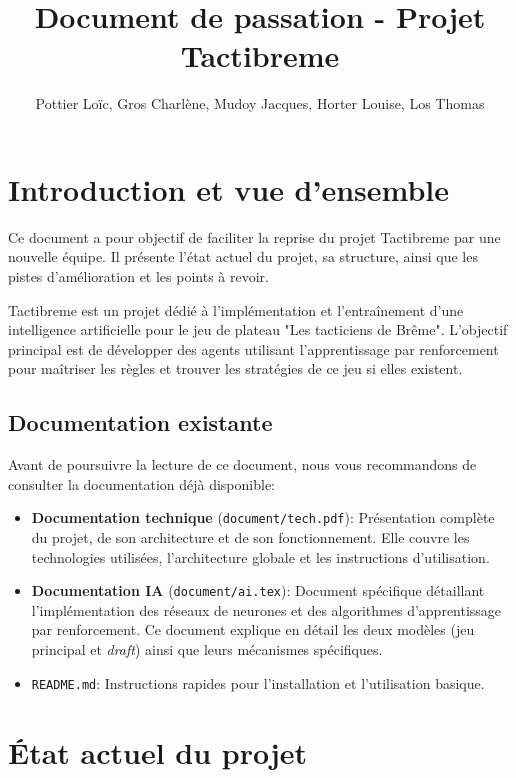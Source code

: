 \documentclass[]{article}
\title{\textbf{Document de passation - Projet Tactibreme}}
\author{Pottier Loïc, Gros Charlène, Mudoy Jacques, Horter Louise, Los Thomas}
\begin{document}
\maketitle

\tableofcontents

\newpage

\section{Introduction et vue d'ensemble}

Ce document a pour objectif de faciliter la reprise du projet Tactibreme par une nouvelle équipe. Il présente l'état actuel du projet, sa structure, ainsi que les pistes d'amélioration et les points à revoir.

Tactibreme est un projet dédié à l'implémentation et l'entraînement d'une intelligence artificielle pour le jeu de plateau "Les tacticiens de Brême". L'objectif principal est de développer des agents utilisant l'apprentissage par renforcement pour maîtriser les règles et trouver les stratégies de ce jeu si elles existent.

\subsection{Documentation existante}

Avant de poursuivre la lecture de ce document, nous vous recommandons de consulter la documentation déjà disponible:

\begin{itemize}
  \item \textbf{Documentation technique} (\texttt{document/tech.pdf}): Présentation complète du projet, de son architecture et de son fonctionnement. Elle couvre les technologies utilisées, l'architecture globale et les instructions d'utilisation.
  \item \textbf{Documentation IA} (\texttt{document/ai.tex}): Document spécifique détaillant l'implémentation des réseaux de neurones et des algorithmes d'apprentissage par renforcement. Ce document explique en détail les deux modèles (jeu principal et \emph{draft}) ainsi que leurs mécanismes spécifiques.
  \item \texttt{README.md}: Instructions rapides pour l'installation et l'utilisation basique.
\end{itemize}

\section{État actuel du projet}
\end{document}
